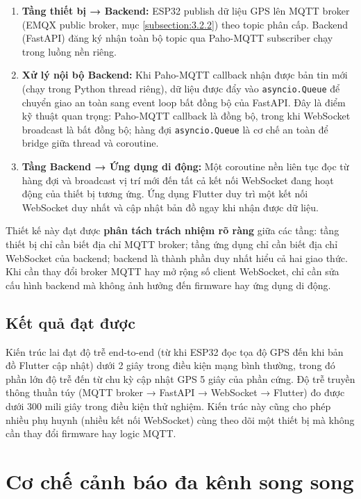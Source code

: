 \documentclass[../DoAn.tex]{subfiles}
\begin{document}
\begin{enumerate}
    \item \textbf{Tầng thiết bị → Backend:} ESP32 publish dữ liệu GPS lên MQTT broker (EMQX public broker, mục \ref{subsection:3.2.2}) theo topic phân cấp. Backend (FastAPI) đăng ký nhận toàn bộ topic qua Paho-MQTT subscriber chạy trong luồng nền riêng.

    \item \textbf{Xử lý nội bộ Backend:} Khi Paho-MQTT callback nhận được bản tin mới (chạy trong Python thread riêng), dữ liệu được đẩy vào \texttt{asyncio.Queue} để chuyển giao an toàn sang event loop bất đồng bộ của FastAPI. Đây là điểm kỹ thuật quan trọng: Paho-MQTT callback là đồng bộ, trong khi WebSocket broadcast là bất đồng bộ; hàng đợi \texttt{asyncio.Queue} là cơ chế an toàn để bridge giữa thread và coroutine.

    \item \textbf{Tầng Backend → Ứng dụng di động:} Một coroutine nền liên tục đọc từ hàng đợi và broadcast vị trí mới đến tất cả kết nối WebSocket đang hoạt động của thiết bị tương ứng. Ứng dụng Flutter duy trì một kết nối WebSocket duy nhất và cập nhật bản đồ ngay khi nhận được dữ liệu.
\end{enumerate}

Thiết kế này đạt được \textbf{phân tách trách nhiệm rõ ràng} giữa các tầng: tầng thiết bị chỉ cần biết địa chỉ MQTT broker; tầng ứng dụng chỉ cần biết địa chỉ WebSocket của backend; backend là thành phần duy nhất hiểu cả hai giao thức. Khi cần thay đổi broker MQTT hay mở rộng số client WebSocket, chỉ cần sửa cấu hình backend mà không ảnh hưởng đến firmware hay ứng dụng di động.

\subsection{Kết quả đạt được}

Kiến trúc lai đạt độ trễ end-to-end (từ khi ESP32 đọc tọa độ GPS đến khi bản đồ Flutter cập nhật) dưới 2 giây trong điều kiện mạng bình thường, trong đó phần lớn độ trễ đến từ chu kỳ cập nhật GPS 5 giây của phần cứng. Độ trễ truyền thông thuần túy (MQTT broker → FastAPI → WebSocket → Flutter) đo được dưới 300 mili giây trong điều kiện thử nghiệm. Kiến trúc này cũng cho phép nhiều phụ huynh (nhiều kết nối WebSocket) cùng theo dõi một thiết bị mà không cần thay đổi firmware hay logic MQTT.

\section{Cơ chế cảnh báo đa kênh song song}
\label{section:5.4}
\end{document}
